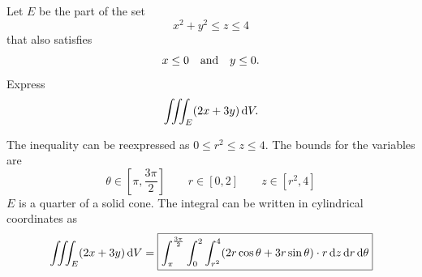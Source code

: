 \documentclass[12pt,answers]{exam}
\begin{document}
\begin{questions}
  \newpage
  \question
  Let $E$ be the part of the set
  \[
  x^2+y^2 \le z \le 4
  \]
  that also satisfies
  \[
  x \le 0 \qand y \le 0.
  \]
  Express
  \[
  \iiint_{E} (2x + 3y) \dif V.
  \]
  \begin{solution}
    The inequality can be reexpressed as 
    $0 \le r^2 \le z \le 4$. 
    The bounds for the variables are
    \[
    \theta \in [\pi, \frac{3\pi}{2}] 
    \qquad 
    r \in [0,2]
    \qquad
    z \in [r^2,4]
    \]
    $E$ is a quarter of a solid cone.
    The integral can be written in cylindrical coordinates as
    \[
    \iiint_E(2x+3y) \dif V
    = \boxed{\int_\pi^{\frac{3\pi}{2}} \int_0^2 \int_{r^2}^4 (2r\cos\theta+3r\sin\theta) \cdot r \dif z \dif r \dif \theta }
    \]
  \end{solution}
  
\end{questions}
\end{document}
